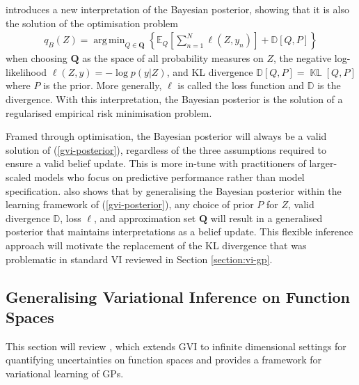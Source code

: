 \documentclass{article}
\newcommand{\KLD}{\operatorname{\mathbb{KL}}}
\DeclareMathOperator*{\argmin}{arg\,min}
\numberwithin{equation}{section}
\begin{document}
\cite{knoblauch2022optimization} introduces a new interpretation of the Bayesian posterior, showing that it is also the solution of the optimisation problem
\begin{align}
    q_B(Z) = \argmin_{Q \in \boldsymbol{Q}} \left\{\mathbb{E}_{Q}\left[\sum_{n=1}^N \ell \left(Z, y_n\right)\right] + \mathbb{D}\left[Q, P\right]\right\}
    \label{gvi-posterior}
\end{align}
when choosing $\boldsymbol{Q}$ as the space of all probability measures on $Z$, the negative log-likelihood $\ell(Z, y) =-\log p\left(y \vert Z\right)$,  and KL divergence $\mathbb{D}\left[Q, P\right] = \KLD\left[Q, P\right]$ where $P$ is the prior.
More generally, $\ell$ is called the loss function and $\mathbb{D}$ is the divergence. With this interpretation, the Bayesian posterior is the solution of a regularised empirical risk minimisation problem.

Framed through optimisation, the Bayesian posterior will always be a valid solution of (\ref{gvi-posterior}), regardless of the three  assumptions required to ensure a valid belief update.
This is more in-tune with practitioners of larger-scaled models who focus on predictive performance rather than model specification.
\cite{knoblauch2022optimization} also shows that by generalising the Bayesian posterior within the learning framework of (\ref{gvi-posterior}), any choice of prior $P$ for $Z$, valid divergence $\mathbb{D}$, loss $\ell$, and approximation set $\boldsymbol{Q}$ will result in a generalised posterior that maintains interpretations as a belief update.
This flexible inference approach will motivate the replacement of the KL divergence that was problematic in standard VI reviewed in Section \ref{section:vi-gp}.

\subsection{Generalising Variational Inference on Function Spaces}
This section will review \cite{wild2022generalized}, which extends GVI to infinite dimensional settings for quantifying uncertainties on function spaces and provides a framework for variational learning of GPs.
\end{document}
